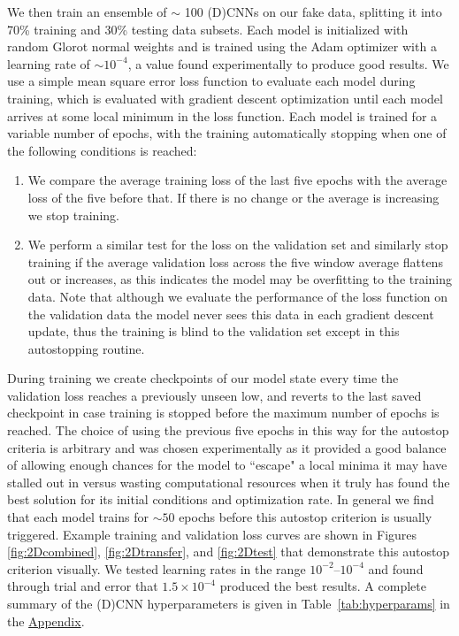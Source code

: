 \documentclass[floatfix,twocolumn,trackchanges,linenumbers]{aastex7}
\begin{document}
We then train an ensemble of $\sim$ 100 (D)CNNs on our fake data, splitting it into 70\% training and 30\% testing data subsets. Each model is initialized with random Glorot normal \citep{glorot_2010} weights and is trained using the Adam optimizer with a learning rate of $\sim10^{-4}$, a value found experimentally to produce good results. We use a simple mean square error loss function to evaluate each model during training, which is evaluated with gradient descent optimization until each model arrives at some local minimum in the loss function. Each model is trained for a variable number of epochs, with the training automatically stopping when one of the following conditions is reached: 
\begin{enumerate}
    \item We compare the average training loss of the last five epochs with the average loss of the five before that. If there is no change or the average is increasing we stop training.
    \item We perform a similar test for the loss on the validation set and similarly stop training if the average validation loss across the five window average flattens out or increases, as this indicates the model may be overfitting to the training data. Note that although we evaluate the performance of the loss function on the validation data the model never sees this data in each gradient descent update, thus the training is blind to the validation set except in this autostopping routine. 
\end{enumerate}
During training we create checkpoints of our model state every time the validation loss reaches a previously unseen low, and reverts to the last saved checkpoint in case training is stopped before the maximum number of epochs is reached. The choice of using the previous five epochs in this way for the autostop criteria is arbitrary and was chosen experimentally as it provided a good balance of allowing enough chances for the model to ``escape" a local minima it may have stalled out in versus wasting computational resources when it truly has found the best solution for its initial conditions and optimization rate. In general we find that each model trains for $\sim 50$ epochs before this autostop criterion is usually triggered. Example training and validation loss curves are shown in Figures \ref{fig:2Dcombined}, \ref{fig:2Dtransfer}, and \ref{fig:2Dtest} that demonstrate this autostop criterion visually. We tested learning rates in the range $10^{-2}$--$10^{-4}$ and found through trial and error that $1.5\times10^{-4}$ produced the best results. A complete summary of the (D)CNN hyperparameters is given in Table~\ref{tab:hyperparams} in the \hyperref[appendix]{Appendix}.
\end{document}
